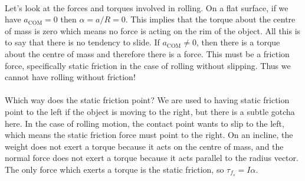 \documentclass[../classical_mechanics.tex]{subfiles}
\begin{document}
        \paragraph{}
        Let's look at the forces and torques involved in rolling.
        On a flat surface, if we have $a_\text{COM}=0$ then $\alpha=a/R=0$.
        This implies that the torque about the centre of mass is zero which means no force is acting on the rim of the object.
        All this is to say that there is no tendency to slide.
        If $a_\text{COM}\neq 0$, then there is a torque about the centre of mass and therefore there is a force.
        This must be a friction force, specifically static friction in the case of rolling without slipping.
        Thus we cannot have rolling without friction!

        \paragraph{}
        Which way does the static friction point?
        We are used to having static friction point to the left if the object is moving to the right, but there is a subtle gotcha here.
        In the case of rolling motion, the contact point wants to slip to the left, which means the static friction force must point to the right.
        On an incline, the weight does not exert a torque because it acts on the centre of mass, and the normal force does not exert a torque because it acts parallel to the radius vector.
        The only force which exerts a torque is the static friction, so $\tau_{f_s}=I\alpha$.
\end{document}
